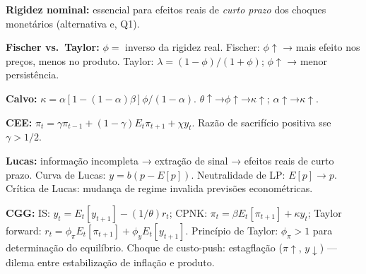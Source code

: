 \documentclass[12pt, a4paper]{article}
\begin{document}
\begin{fatorbox}[title={Lista II --- Fatos-Chave NK}]
\textbf{Rigidez nominal:} essencial para efeitos reais de \emph{curto prazo} dos choques monetários (alternativa e, Q1).

\textbf{Fischer vs.\ Taylor:} $\phi = $ inverso da rigidez real. Fischer: $\phi\uparrow$ → mais efeito nos preços, menos no produto. Taylor: $\lambda = (1-\phi)/(1+\phi)$; $\phi\uparrow$ → menor persistência.

\textbf{Calvo:} $\kappa = \alpha[1-(1-\alpha)\beta]\phi/(1-\alpha)$. $\theta\uparrow$→$\phi\uparrow$→$\kappa\uparrow$; $\alpha\uparrow$→$\kappa\uparrow$.

\textbf{CEE:} $\pi_t = \gamma\pi_{t-1} + (1-\gamma)E_t\pi_{t+1} + \chi y_t$. Razão de sacrifício positiva sse $\gamma > 1/2$.

\textbf{Lucas:} informação incompleta → extração de sinal → efeitos reais de curto prazo. Curva de Lucas: $y = b(p - E[p])$. Neutralidade de LP: $E[p] \to p$. Crítica de Lucas: mudança de regime invalida previsões econométricas.

\textbf{CGG:} IS: $y_t = E_t[y_{t+1}] - (1/\theta)r_t$; CPNK: $\pi_t = \beta E_t[\pi_{t+1}] + \kappa y_t$; Taylor forward: $r_t = \phi_\pi E_t[\pi_{t+1}] + \phi_y E_t[y_{t+1}]$. Princípio de Taylor: $\phi_\pi > 1$ para determinação do equilíbrio. Choque de custo-push: estagflação ($\pi\uparrow$, $y\downarrow$) — dilema entre estabilização de inflação e produto.
\end{fatorbox}
\end{document}

